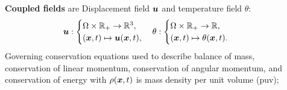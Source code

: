 \documentclass[25pt, a0paper,
portrait,
margin=2mm, 
innermargin=2mm, 
blockverticalspace=7mm, %
colspace=2mm, %
subcolspace=0mm]{tikzposter}
\makeatletter
\newcommand*{\inputfig}[3][htb]{{
    \def\fps@figure{#1}
    \def\DIR{#2}
    \def\LABEL{#3}
    \graphicspath{{\DIR/}}
    
}}
\makeatother
\begin{document}
\begin{columns}
	{
		\begin{minipage}{0.35\textwidth}
			\begin{mdframed}
				\begin{center}
					\inputfig{floats/structuralfivefields_multi_edited}{structuralfivefields_multi_edited}
				\end{center}
				\vspace{-12mm}
			\end{mdframed}
			\begin{mdframed}
				\textbf{Coupled fields} are  
				Displacement field ${\boldsymbol{\mathnormal u}}$ and temperature field $\theta$:
				\begin{align*}
					{\boldsymbol{\mathnormal u}}:
					\begin{cases}
						\Omega \times \mathbb{R}_{+} \rightarrow \mathbb{R}^3, \\
						({\boldsymbol{\mathnormal x}},t) \mapsto {\boldsymbol{\mathnormal u}}({\boldsymbol{\mathnormal x}},t),
					\end{cases}
					\theta:
					\begin{cases}
						\Omega \times \mathbb{R}_{+} \rightarrow \mathbb{R}, \\
						({\boldsymbol{\mathnormal x}},t) \mapsto \theta({\boldsymbol{\mathnormal x}},t).
					\end{cases}
				\end{align*}
				Governing conservation equations
				used to describe balance of mass, 
				conservation of linear momentum, 
				conservation of angular momentum,
				and conservation of energy
				with
				$\rho({\boldsymbol{\mathnormal x}},t)$ is mass density per unit volume (puv); 

\end{mdframed}
\end{minipage}}
\end{columns}
\end{document}
